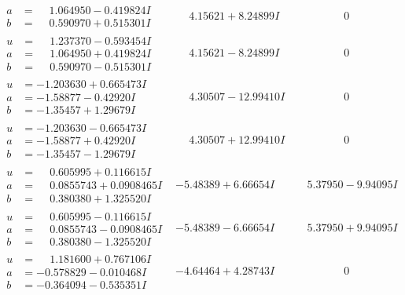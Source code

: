 \documentclass[1p]{elsarticle_modified}
\theoremstyle{definition}
\begin{document}
$$\begin{array}{c|c|c}
\begin{aligned}
a &= \phantom{-}1.064950 - 0.419824 I \\
b &= \phantom{-}0.590970 + 0.515301 I\end{aligned}
 & \phantom{-}4.15621 + 8.24899 I & \phantom{-0.000000 } 0 \\ \hline\begin{aligned}
u &= \phantom{-}1.237370 - 0.593454 I \\
a &= \phantom{-}1.064950 + 0.419824 I \\
b &= \phantom{-}0.590970 - 0.515301 I\end{aligned}
 & \phantom{-}4.15621 - 8.24899 I & \phantom{-0.000000 } 0 \\ \hline\begin{aligned}
u &= -1.203630 + 0.665473 I \\
a &= -1.58877 - 0.42920 I \\
b &= -1.35457 + 1.29679 I\end{aligned}
 & \phantom{-}4.30507 - 12.99410 I & \phantom{-0.000000 } 0 \\ \hline\begin{aligned}
u &= -1.203630 - 0.665473 I \\
a &= -1.58877 + 0.42920 I \\
b &= -1.35457 - 1.29679 I\end{aligned}
 & \phantom{-}4.30507 + 12.99410 I & \phantom{-0.000000 } 0 \\ \hline\begin{aligned}
u &= \phantom{-}0.605995 + 0.116615 I \\
a &= \phantom{-}0.0855743 + 0.0908465 I \\
b &= \phantom{-}0.380380 + 1.325520 I\end{aligned}
 & -5.48389 + 6.66654 I & \phantom{-}5.37950 - 9.94095 I \\ \hline\begin{aligned}
u &= \phantom{-}0.605995 - 0.116615 I \\
a &= \phantom{-}0.0855743 - 0.0908465 I \\
b &= \phantom{-}0.380380 - 1.325520 I\end{aligned}
 & -5.48389 - 6.66654 I & \phantom{-}5.37950 + 9.94095 I \\ \hline\begin{aligned}
u &= \phantom{-}1.181600 + 0.767106 I \\
a &= -0.578829 - 0.010468 I \\
b &= -0.364094 - 0.535351 I\end{aligned}
 & -4.64464 + 4.28743 I & \phantom{-0.000000 } 0\\

\end{array}$$
\end{document}
